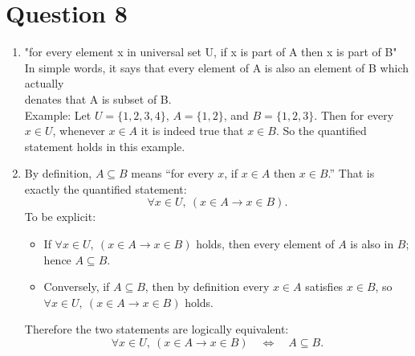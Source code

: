 \documentclass[twoside]{article}
\begin{document}
\section*{Question 8}
    \begin{enumerate}
        \item[(a)] "for every element x in universal set U, if x is part of A then x is part of B" \\
            In simple words, it says that every element of A is also an element of B which actually \\
            denates that A is subset of B. \\
            Example: Let \(U=\{1,2,3,4\}\), \(A=\{1,2\}\), and \(B=\{1,2,3\}\). Then for every \(x\in U\), whenever \(x\in A\) it is indeed true that \(x\in B\). So the quantified statement holds in this example.
        \item[(b)] By definition, \(A\subseteq B\) means “for every \(x\), if \(x\in A\) then \(x\in B\).” That is exactly the quantified statement:
        \[
        \forall x\in U,\ (x\in A \rightarrow x\in B).
        \]
        To be explicit:

        \begin{itemize}
        \item If \(\forall x\in U,\ (x\in A \rightarrow x\in B)\) holds, then every element of \(A\) is also in \(B\); hence \(A\subseteq B\).
        \item Conversely, if \(A\subseteq B\), then by definition every \(x\in A\) satisfies \(x\in B\), so \(\forall x\in U,\ (x\in A \rightarrow x\in B)\) holds.
        \end{itemize}

        Therefore the two statements are logically equivalent:
        \[
        \forall x\in U,\ (x\in A \rightarrow x\in B)\quad\Longleftrightarrow\quad A\subseteq B.
        \]

    \end{enumerate}
\
\end{document}
